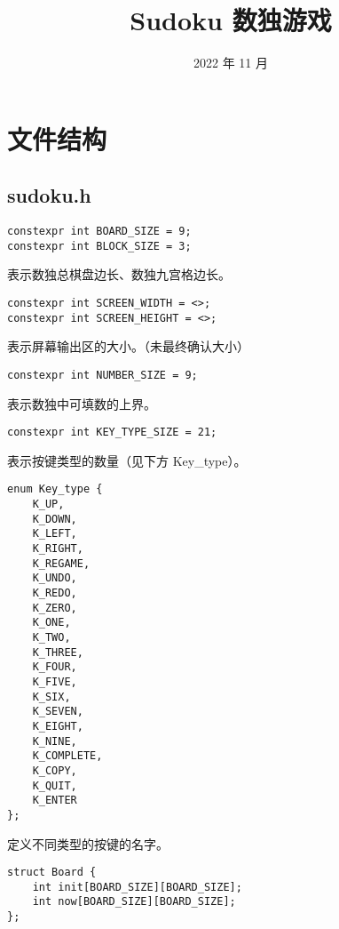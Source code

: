 \documentclass{article}
\title{Sudoku 数独游戏}
\date{2022 年 11 月}
\begin{document}
    \maketitle

    \tableofcontents

    
    \newpage

    \section{文件结构}
    \subsection{sudoku.h}

    \begin{lstlisting}
constexpr int BOARD_SIZE = 9;
constexpr int BLOCK_SIZE = 3;
    \end{lstlisting}

    表示数独总棋盘边长、数独九宫格边长。

    \begin{lstlisting}
constexpr int SCREEN_WIDTH = <>;
constexpr int SCREEN_HEIGHT = <>;
    \end{lstlisting}

    表示屏幕输出区的大小。（未最终确认大小）

    \begin{lstlisting}
constexpr int NUMBER_SIZE = 9;
    \end{lstlisting}

    表示数独中可填数的上界。

    \begin{lstlisting}
constexpr int KEY_TYPE_SIZE = 21;
    \end{lstlisting}

    表示按键类型的数量（见下方 Key\_type）。

    \begin{lstlisting}
enum Key_type {
    K_UP,
    K_DOWN,
    K_LEFT,
    K_RIGHT,
    K_REGAME,
    K_UNDO,
    K_REDO,
    K_ZERO,
    K_ONE,
    K_TWO,
    K_THREE,
    K_FOUR,
    K_FIVE,
    K_SIX,
    K_SEVEN,
    K_EIGHT,
    K_NINE,
    K_COMPLETE,
    K_COPY,
    K_QUIT,
    K_ENTER
};
    \end{lstlisting}

    定义不同类型的按键的名字。

    \begin{lstlisting}
struct Board {
    int init[BOARD_SIZE][BOARD_SIZE];
    int now[BOARD_SIZE][BOARD_SIZE];
};
    \end{lstlisting}
\end{document}
